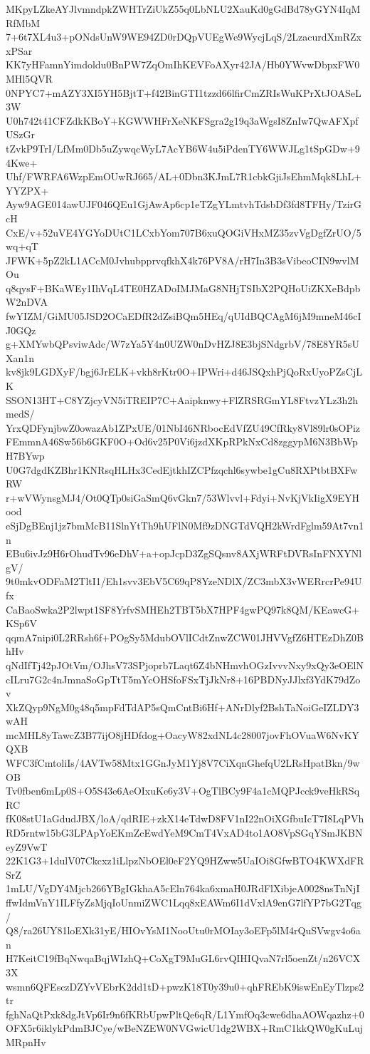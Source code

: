 MKpyLZkeAYJlvmndpkZWHTrZiUkZ55q0LbNLU2XauKd0gGdBd78yGYN4IqMRfMbM
7+6t7XL4u3+pONdsUnW9WE94ZD0rDQpVUEgWe9WycjLqS/2LzacurdXmRZxxPSar
KK7yHFamnYimdoldu0BnPW7ZqOmIhKEVFoAXyr42JA/Hb0YWvwDbpxFW0MHl5QVR
0NPYC7+mAZY3XI5YH5BjtT+f42BinGTI1tzzd66lfirCmZRIsWuKPrXtJOASeL3W
U0h742t41CFZdkKBoY+KGWWHFrXeNKFSgra2g19q3aWgsI8ZnIw7QwAFXpfUSzGr
tZvkP9TrI/LfMm0Db5uZywqcWyL7AcYB6W4u5iPdenTY6WWJLg1tSpGDw+94Kwe+
Uhf/FWRFA6WzpEmOUwRJ665/AL+0Dbn3KJmL7R1cbkGjiJsEhmMqk8LhL+YYZPX+
Ayw9AGE014awUJF046QEu1GjAwAp6cp1eTZgYLmtvhTdsbDf3fd8TFHy/TzirGcH
CxE/v+52uVE4YGYoDUtC1LCxbYom707B6xuQOGiVHxMZ35zvVgDgfZrUO/5wq+qT
JFWK+5pZ2kL1ACcM0JvhubpprvqfkhX4k76PV8A/rH7In3B3sVibeoCIN9wvlMOu
q8qysF+BKaWEy1IhVqL4TE0HZADoIMJMaG8NHjTSIbX2PQHoUiZKXeBdpbW2nDVA
fwYIZM/GiMU05JSD2OCaEDfR2dZsiBQm5HEq/qUIdBQCAgM6jM9mneM46cIJ0GQz
g+XMYwbQPsviwAdc/W7zYa5Y4n0UZW0nDvHZJ8E3bjSNdgrbV/78E8YR5sUXan1n
kv8jk9LGDXyF/bgj6JrELK+vkh8rKtr0O+IPWri+d46JSQxhPjQoRxUyoPZsCjLK
SSON13HT+C8YZjcyVN5iTREIP7C+Aaipknwy+FlZRSRGmYL8FtvzYLz3h2hmedS/
YrxQDFynjbwZ0owazAb1ZPxUE/01NbI46NRbocEdVfZU49CfRky8Vl89lr0sOPiz
FEmmnA46Sw56b6GKF0O+Od6v25P0Vi6jzdXKpRPkNxCd8zggypM6N3BbWpH7BYwp
U0G7dgdKZBhr1KNRsqHLHx3CedEjtkhIZCPfzqchl6sywbe1gCu8RXPtbtBXFwRW
r+wVWynsgMJ4/Ot0QTp0siGaSmQ6vGkn7/53Wlvvl+Fdyi+NvKjVkIigX9EYHood
eSjDgBEnj1jz7bmMcB11SlnYtTh9hUFlN0Mf9zDNGTdVQH2kWrdFglm59At7vn1n
EBu6ivJz9H6rOhudTv96eDhV+a+opJcpD3ZgSQsnv8AXjWRFtDVRsInFNXYNlgV/
9t0mkvODFaM2TltI1/Eh1svv3EbV5C69qP8YzeNDlX/ZC3mbX3vWERrcrPe94Ufx
CaBaoSwka2P2lwpt1SF8YrfvSMHEh2TBT5bX7HPF4gwPQ97k8QM/KEawcG+KSp6V
qqmA7nipi0L2RRsh6f+POgSy5MdubOVlICdtZnwZCW01JHVVgfZ6HTEzDhZ0BhHv
qNdIfTj42pJOtVm/OJhsV73SPjoprb7Laqt6Z4bNHmvhOGzIvvvNxy9xQy3eOElN
cILru7G2c4nJmnaSoGpTtT5mYcOHSfoFSxTjJkNr8+16PBDNyJJlxf3YdK79dZov
XkZQyp9NgM0g48q5mpFdTdAP5sQmCntBi6Hf+ANrDlyf2BshTaNoiGeIZLDY3wAH
mcMHL8yTawcZ3B77ijO8jHDfdog+OacyW82xdNL4c28007jovFhOVuaW6NvKYQXB
WFC3fCmtoliIs/4AVTw58Mtx1GGnJyM1Yj8V7CiXqnGhefqU2LRsHpatBkn/9wOB
Tv0fben6mLp0S+O5S43e6AeOIxuKe6y3V+OgTlBCy9F4a1cMQPJcck9veHkRSqRC
fK08stU1aGdudJBX/loA/qdRIE+zkX14eTdwD8FV1nI22nOiXGfbuIcT7I8LqPVh
RD5rntw15bG3LPApYoEKmZcEwdYeM9CmT4VxAD4to1AO8VpSGqYSmJKBNeyZ9VwT
22K1G3+1dulV07Ckcxz1iLlpzNbOEl0eF2YQ9HZww5UaIOi8GfwBTO4KWXdFRSrZ
1mLU/VgDY4Mjcb266YBgIGkhaA5cEln764ka6xmaH0JRdFlXibjeA0028nsTnNjI
ffwIdmVnY1ILFfyZsMjqIoUnmiZWC1Lqq8xEAWm6I1dVxlA9enG7lfYP7bG2Tqg/
Q8/ra26UY81loEXk31yE/HIOvYsM1NooUtu0rMOIay3oEFp5lM4rQuSVwgv4o6an
H7KeitC19fBqNwqaBqjWIzhQ+CoXgT9MuGL6rvQIHIQvaN7rl5oenZt/n26VCX3X
wsmn6QFEsczDZYvVEbrK2dd1tD+pwzK18T0y39u0+qhFREbK9iswEnEyTlzps2tr
fghNaQtPxk8dgJtVp6Ir9n6fKRbUpwPltQe6qR/L1YmfOq3cwe6dhaAOWqazhz+0
OFX5r6iklykPdmBJCye/wBeNZEW0NVGwicU1dg2WBX+RmC1kkQW0gKuLujMRpnHv
